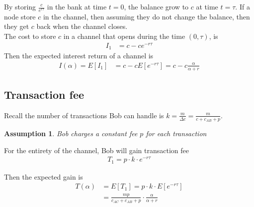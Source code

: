 \documentclass[12pt]{article}
\theoremstyle{plain}
\newtheorem{assumption}{Assumption}
\theoremstyle{remark}
\theoremstyle{definition}
\begin{document}
By storing $\frac{c}{e^{r\tau}}$ in the bank at time $t=0$, the balance grow to $c$ at time $t=\tau$. If a node store $c$ in the channel, then assuming they do not change the balance, then they get $c$ back when the channel closes.\\
The cost to store $c$ in a channel that opens during the time $(0,\tau)$, is 
\begin{align}
    I_1 &= c-ce^{-r\tau}
\end{align}
Then the expected interest return of a channel is 
\begin{align}
    I(\alpha) = E[I_1] &= c-cE[e^{-r\tau}] = c-c\frac{\alpha}{\alpha + r}
\end{align}

\subsection{Transaction fee}
Recall the number of transactions Bob can handle is $k = \frac{m}{\Delta c}=\frac{m}{c+c_{AB}+p}$. 
\begin{assumption}
    Bob charges a constant fee $p$ for each transaction
\end{assumption}
For the entirety of the channel, Bob will gain transaction fee
\begin{align}
    T_1 = p\cdot k \cdot e^{-r\tau}
\end{align}

Then the expected gain is 
\begin{align}
    T(\alpha) &= E[T_1] = p\cdot k \cdot E[e^{-r\tau}]\\
    & = \frac{mp}{c_{AC}+c_{AB}+p} \cdot \frac{\alpha}{\alpha + r}
\end{align}
\end{document}
